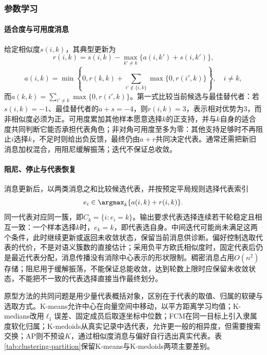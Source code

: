 \subsubsection{参数学习}

\paragraph{适合度与可用度消息}

给定相似度$s(i,k)$，其典型更新为
\[
 r(i,k)=s(i,k)-\max_{k'\ne k}\{a(i,k')+s(i,k')\},
\]
\[
 a(i,k)=
 \min\left\{0,r(k,k)+
 \sum_{i'\notin\{i,k\}}\max\{0,r(i',k)\}\right\},
 \quad i\ne k,
\]
而$a(k,k)=\sum_{i'\ne k}\max\{0,r(i',k)\}$。第一式比较当前候选与最佳替代者：若$s(i,k)=-1$、最佳替代者的$a+s=-4$，则$r(i,k)=3$，表示相对优势为3，而非相似度必须为正。可用度累加其他样本愿意选择$k$的正支持，并与$k$自身的适合度共同判断它能否承担代表角色；非对角可用度至多为零：其他支持足够时不再阻止$i$选择$k$，不足时则给出负反馈，最终仍由$a+r$共同决定代表。通常还需把新旧消息加权混合，用阻尼缓解振荡；迭代不保证总收敛。

\paragraph{阻尼、停止与代表恢复}

消息更新后，以两类消息之和比较候选代表，并按预定平局规则选择代表索引
\[
 e_i\in\argmax_k\{a(i,k)+r(i,k)\}.
\]
同一代表对应同一簇，即$C_k=\{i:e_i=k\}$。输出要求代表选择连续若干轮稳定且相互一致：一个样本选择$k$时，$e_k=k$，即代表选自身。中间迭代可能尚未满足这两个条件，此时继续更新或返回未收敛状态，保留当前消息供诊断。偏好控制选取代表的代价，不是对语义簇数的直接估计；采用负平方欧氏相似度时，固定代表后仍是最近代表分配，消息传播没有消除中心表示的形状限制。稠密消息占用$O(n^2)$存储；阻尼用于缓解振荡，不能保证总能收敛，达到轮数上限时应保留未收敛状态，不能把不一致的代表选择直接当作最终划分。

原型方法的共同问题是用少量代表概括对象，区别在于代表的取值、归属的软硬与选取方式。K-means允许中心在向量空间中移动，以平方距离学习均值；K-medians改用$\ell_1$误差、固定成员后取逐坐标中位数；FCM在同一目标上引入隶属度软化归属；K-medoids从真实记录中选代表，允许更一般的相异度，但需要搜索交换；AP则不预设$K$，通过相似度消息与偏好自行选出真实代表。表\ref{tab:clustering-partition}保留K-means与K-medoids两项主要差别。

